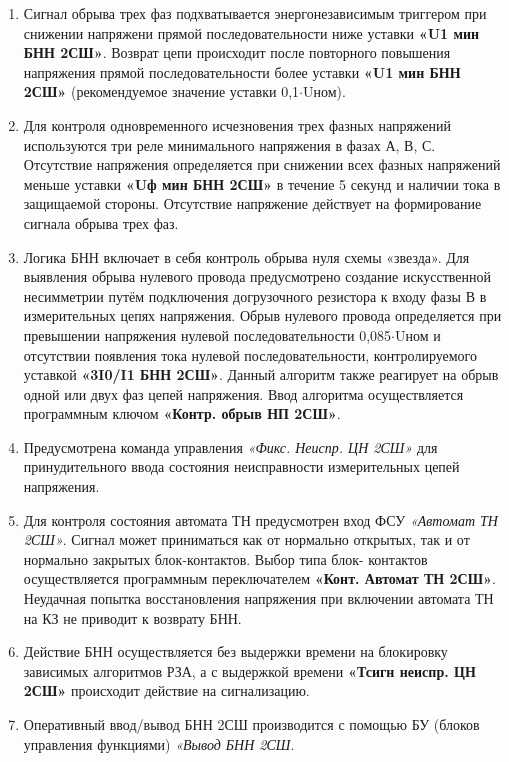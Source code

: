 \begin{enumerate}[label=\arabic{section}.\arabic{subsection}.\arabic*,  align=left, labelsep=4pt, leftmargin=0pt, itemindent=57pt]
\item
Сигнал обрыва трех фаз подхватывается энергонезависимым триггером при снижении напряжени
прямой последовательности ниже уставки \textbf{«U1 мин БНН 2СШ»}. Возврат цепи происходит после повторного
повышения напряжения прямой последовательности более уставки \textbf{«U1 мин БНН 2СШ»} (рекомендуемое значение
уставки 0,1$\cdot$Uном).

\item
Для контроля одновременного исчезновения трех фазных напряжений используются три реле
минимального напряжения в фазах А, В, С. Отсутствие напряжения определяется при снижении всех фазных
напряжений меньше уставки \textbf{«Uф мин БНН 2СШ»} в течение 5 секунд и наличии тока в защищаемой стороны.
Отсутствие напряжение действует на формирование сигнала обрыва трех фаз.

\item
Логика БНН включает в себя контроль обрыва нуля схемы «звезда». Для выявления обрыва нулевого
провода предусмотрено создание искусственной несимметрии путём подключения догрузочного резистора к
входу фазы В в измерительных цепях напряжения. Обрыв нулевого провода определяется при превышении
напряжения нулевой последовательности 0,085$\cdot$Uном и отсутствии появления тока нулевой
последовательности, контролируемого уставкой \textbf{«3I0/I1 БНН 2СШ»}. Данный алгоритм также реагирует на обрыв
одной или двух фаз цепей напряжения. Ввод алгоритма осуществляется программным ключом
\textbf{«Контр. обрыв НП 2СШ»}.

\item 
Предусмотрена команда управления \textit{«Фикс. Неиспр. ЦН 2СШ»} для принудительного ввода состояния неисправности измерительных цепей напряжения.

\item
Для контроля состояния автомата ТН предусмотрен вход ФСУ \textit{«Автомат ТН 2СШ»}. Сигнал может
приниматься как от нормально открытых, так и от нормально закрытых блок-контактов. Выбор типа блок-
контактов осуществляется программным переключателем \textbf{«Конт. Автомат ТН 2СШ»}. Неудачная попытка
восстановления напряжения при включении автомата ТН на КЗ не приводит к возврату БНН.

\item
Действие БНН осуществляется без выдержки времени на блокировку зависимых алгоритмов РЗА, а с
выдержкой времени \textbf{«Тсигн неиспр. ЦН 2СШ»} происходит действие на сигнализацию.

\item
Оперативный ввод/вывод БНН 2СШ производится с помощью БУ (блоков управления функциями) \textit{«Вывод БНН 2СШ}.


\end{enumerate}
